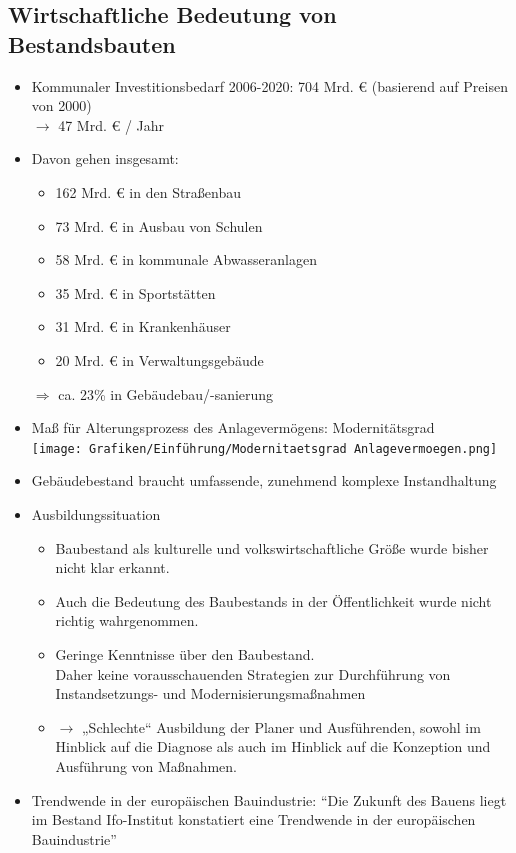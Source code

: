 \documentclass[fleqn,twoside,dvipsnames]{article}
\begin{document}
    \subsection{Wirtschaftliche Bedeutung von Bestandsbauten}
        \begin{itemize}
            \item Kommunaler Investitionsbedarf 2006-2020: 704 Mrd. € (basierend auf Preisen von 2000)\\
                    $\rightarrow$ 47 Mrd. € / Jahr
            \item Davon gehen insgesamt:
                \begin{itemize}
                    \item 162 Mrd. € in den Straßenbau
                    \item 73 Mrd. € in Ausbau von Schulen
                    \item 58 Mrd. € in kommunale Abwasseranlagen
                    \item 35 Mrd. € in Sportstätten
                    \item 31 Mrd. € in Krankenhäuser
                    \item 20 Mrd. € in Verwaltungsgebäude
                \end{itemize}
                $\Rightarrow$ ca. 23\% in Gebäudebau/-sanierung
            \newpage
            \item Maß für Alterungsprozess des Anlagevermögens: Modernitätsgrad\\
                        \texttt{[image: Grafiken/Einführung/Modernitaetsgrad Anlagevermoegen.png]}
            \item Gebäudebestand braucht umfassende, zunehmend komplexe Instandhaltung
            \item Ausbildungssituation
                \begin{itemize}
                    \item Baubestand als kulturelle und volkswirtschaftliche Größe wurde bisher nicht klar erkannt.
                    \item Auch die Bedeutung des Baubestands in der Öffentlichkeit wurde nicht richtig wahrgenommen.
                    \item Geringe Kenntnisse über den Baubestand. \\
                    Daher keine vorausschauenden Strategien zur Durchführung von Instandsetzungs- und Modernisierungsmaßnahmen
                    \item $\rightarrow$ „Schlechte“ Ausbildung der Planer und Ausführenden, sowohl im Hinblick auf die Diagnose als auch im Hinblick auf die Konzeption und Ausführung von Maßnahmen.
                \end{itemize}
            \item Trendwende in der europäischen Bauindustrie: \enquote{Die Zukunft des Bauens liegt im Bestand Ifo-Institut konstatiert eine Trendwende in der europäischen Bauindustrie}
        \end{itemize}
\end{document}
